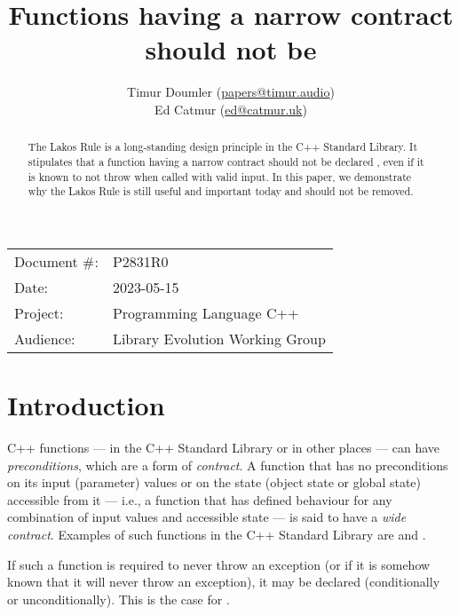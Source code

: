 


\title{Functions having a narrow contract should not be }
\author{ Timur Doumler \small(\href{mailto:papers@timur.audio}{papers@timur.audio})   \\
Ed Catmur \small(\href{mailto:ed@catmur.uk}{ed@catmur.uk})  }
\date{}
\maketitle

\begin{tabular}{ll}
Document \#: & P2831R0 \\
Date: &2023-05-15 \\
Project: & Programming Language C++ \\
Audience: & Library Evolution Working Group
\end{tabular}

\begin{abstract}
The Lakos Rule is a long-standing design principle in the C++ Standard Library. It stipulates that a function having a narrow contract should not be declared , even if it is known to not throw when called with valid input. In this paper, we demonstrate why the Lakos Rule is still useful and important today and should not be removed.
\end{abstract}

\section{Introduction}
\label{sec:intro}

C++ functions --- in the C++ Standard Library or in other places --- can have \emph{preconditions}, which are a form of \emph{contract}. A function that has no preconditions on its input (parameter) values or on the state (object state or global state) accessible from it --- i.e., a function that has defined behaviour for any combination of input values and accessible state --- is said to have a \emph{wide contract}. Examples of such functions in the C++ Standard Library are  and .

If such a function is required to never throw an exception (or if it is somehow known that it will never throw an exception), it may be declared  (conditionally or unconditionally). This is the case for .

